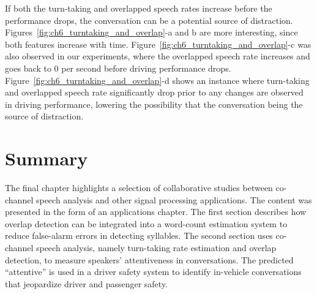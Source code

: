 \newpage
If both the turn-taking and overlapped speech rates increase before the performance drops, the conversation can be a potential source of distraction. 
Figures~\ref{fig:ch6_turntaking_and_overlap}-a and b are more interesting, since both features increase with time. 
Figure~\ref{fig:ch6_turntaking_and_overlap}-c was also observed in our experiments, where the overlapped speech rate increases and goes back to $0$ per second before driving performance drops. 
Figure~\ref{fig:ch6_turntaking_and_overlap}-d shows an instance where turn-taking and overlapped speech rate significantly drop prior to any changes are observed in driving performance, lowering the possibility that the conversation being the source of distraction. 

\newpage
\section{Summary}
\label{sec:ch4_summary}
The final chapter highlights a selection of collaborative studies between co-channel speech analysis and other signal processing applications. 
The content was presented in the form of an applications chapter. 
The first section describes how overlap detection can be integrated into a word-count estimation system to reduce false-alarm errors in detecting syllables. 
The second section uses co-channel speech analysis, namely turn-taking rate estimation and overlap detection, to measure speakers' attentiveness in conversations. 
The predicted ``attentive'' is used in a driver safety system to identify in-vehicle conversations that jeopardize driver and passenger safety. 
